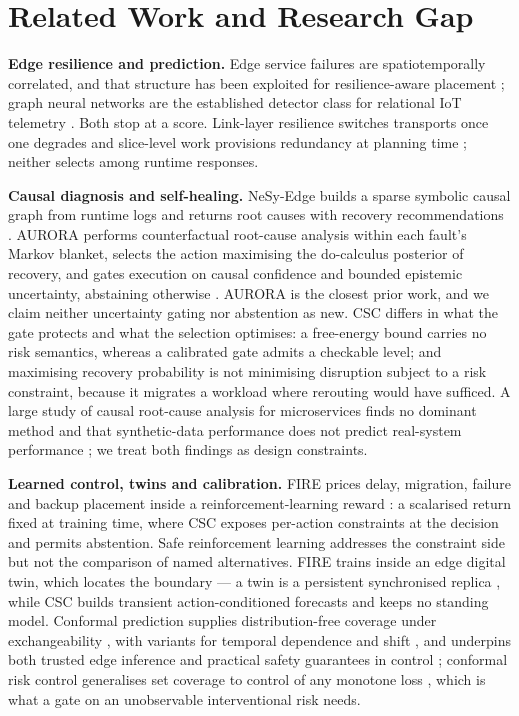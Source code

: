 \documentclass[journal]{IEEEtran}
\begin{document}
\section{Related Work and Research Gap}

\textbf{Edge resilience and prediction.}
Edge service failures are spatiotemporally correlated, and that structure has
been exploited for resilience-aware placement \cite{aral2021spatiotemporal};
graph neural networks are the established detector class for relational IoT
telemetry \cite{wu2022gnniiot}. Both stop at a score. Link-layer resilience
switches transports once one degrades \cite{kumar2023resilientedge} and
slice-level work provisions redundancy at planning time
\cite{esmat2023slicing}; neither selects among runtime responses.

\textbf{Causal diagnosis and self-healing.}
NeSy-Edge builds a sparse symbolic causal graph from runtime logs and returns
root causes with recovery recommendations \cite{ye2026nesyedge}. AURORA performs
counterfactual root-cause analysis within each fault's Markov blanket, selects
the action maximising the do-calculus posterior of recovery, and gates execution
on causal confidence and bounded epistemic uncertainty, abstaining otherwise
\cite{desilva2026aurora}. AURORA is the closest prior work, and we claim neither
uncertainty gating nor abstention as new. CSC differs in what the gate protects
and what the selection optimises: a free-energy bound carries no risk semantics,
whereas a calibrated gate admits a checkable level; and maximising recovery
probability is not minimising disruption subject to a risk constraint, because
it migrates a workload where rerouting would have sufficed. A large study of
causal root-cause analysis for microservices finds no dominant method and that
synthetic-data performance does not predict real-system performance
\cite{pham2024rca}; we treat both findings as design constraints.

\textbf{Learned control, twins and calibration.}
FIRE prices delay, migration, failure and backup placement inside a
reinforcement-learning reward \cite{siew2022fire}: a scalarised return fixed at
training time, where CSC exposes per-action constraints at the decision and
permits abstention. Safe reinforcement learning addresses the constraint side
\cite{garcia2015saferl} but not the comparison of named alternatives. FIRE trains inside an edge digital twin, which
locates the boundary --- a twin is a persistent synchronised replica
\cite{wu2021dtn}, while CSC builds transient action-conditioned forecasts and
keeps no standing model. Conformal prediction supplies distribution-free
coverage under exchangeability \cite{angelopoulos2021gentle}, with variants for
temporal dependence \cite{xu2023cptimeseries} and shift \cite{gibbs2021aci}, and
underpins both trusted edge inference \cite{huang2025cascades} and practical
safety guarantees in control \cite{lindemann2025cpcontrol}; conformal risk
control generalises set coverage to control of any monotone loss
\cite{angelopoulos2024crc}, which is what a gate on an unobservable
interventional risk needs.
\end{document}
